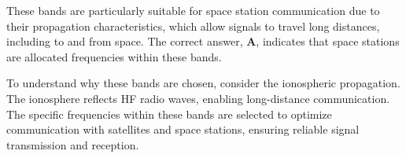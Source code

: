 These bands are particularly suitable for space station communication due to their propagation characteristics, which allow signals to travel long distances, including to and from space. The correct answer, \textbf{A}, indicates that space stations are allocated frequencies within these bands.

To understand why these bands are chosen, consider the ionospheric propagation. The ionosphere reflects HF radio waves, enabling long-distance communication. The specific frequencies within these bands are selected to optimize communication with satellites and space stations, ensuring reliable signal transmission and reception.

